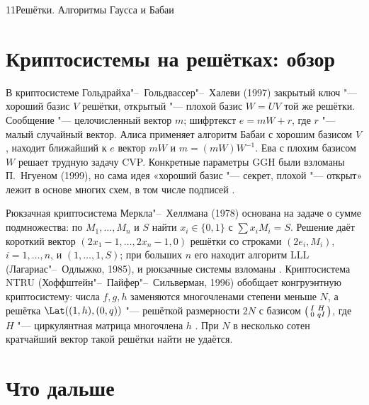 \begin{lecture}{11}{Решётки. Алгоритмы Гаусса и Бабаи}

\section{Криптосистемы на решётках: обзор}

\begin{remark}[GGH]
В криптосистеме Гольдрайха"--~Гольдвассер"--~Халеви (1997) закрытый ключ "--- хороший базис
$V$ решётки, открытый "--- плохой базис $W = UV$ той же решётки. Сообщение "--- целочисленный
вектор $m$; шифртекст $e = mW + r$, где $r$ "--- малый случайный вектор. Алиса применяет
алгоритм Бабаи с хорошим базисом $V$, находит ближайший к $e$ вектор $mW$ и $m = (mW)W^{-1}$.
Ева с плохим базисом $W$ решает трудную задачу CVP. Конкретные параметры GGH были взломаны
П.~Нгуеном (1999), но сама идея «хороший базис "--- секрет, плохой "--- открыт» лежит в основе
многих схем, в том числе подписей \cite[разд.~7.8]{hps}.
\end{remark}

\begin{remark}
Рюкзачная криптосистема Меркла"--~Хеллмана (1978) основана на задаче о сумме подмножества:
по $M_1, \dots, M_n$ и $S$ найти $x_i \in \{0, 1\}$ с $\sum x_i M_i = S$. Решение даёт
короткий вектор $(2x_1 - 1, \dots, 2x_n - 1, 0)$ решётки со строками $(2e_i, M_i)$,
$i = 1, \dots, n$, и $(1, \dots, 1, S)$; при больших $n$ его находит алгоритм LLL
(Лагариас"--~Одлыжко, 1985), и рюкзачные системы взломаны \cite[разд.~7.2]{hps}.
Криптосистема NTRU (Хоффштейн"--~Пайфер"--~Сильверман, 1996) обобщает конгруэнтную
криптосистему: числа $f, g, h$ заменяются многочленами степени меньше $N$, а решётка
$\Lat((1, h), (0, q))$ "--- решёткой размерности $2N$ с базисом
$\begin{psmallmatrix} I & H \\ 0 & qI \end{psmallmatrix}$, где $H$ "--- циркулянтная матрица
многочлена $h$ \cite[разд.~7.10--7.11]{hps}. При $N$ в несколько сотен кратчайший вектор
такой решётки найти не удаётся.
\end{remark}


\section{Что дальше}


\end{lecture}
